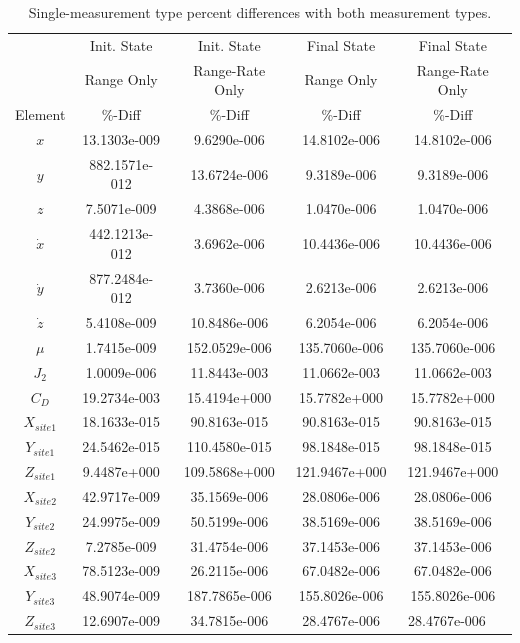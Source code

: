 \documentclass[]{aiaa-tc}%
\begin{document}
	\begin{table}[H]%
		\begin{center}
			\caption{Single-measurement type percent differences with both measurement types.}
			\label{t:SingleMeasDiff}
			\begin{tabular}{c|c|c|c|c}
\hline & Init. State & Init. State & Final State & Final State \\
 & Range Only & Range-Rate Only & Range Only & Range-Rate Only\\ 
Element & \%-Diff & \%-Diff & \%-Diff & \%-Diff\\ \hline
$x$         &     13.1303e-009  &   9.6290e-006 &   14.8102e-006 &   14.8102e-006 \\
$y$         &    882.1571e-012  &  13.6724e-006 &    9.3189e-006 &    9.3189e-006 \\
$z$         &      7.5071e-009  &   4.3868e-006 &    1.0470e-006 &    1.0470e-006 \\
$\dot{x}$   &    442.1213e-012  &   3.6962e-006 &   10.4436e-006 &   10.4436e-006 \\
$\dot{y}$   &    877.2484e-012  &   3.7360e-006 &    2.6213e-006 &    2.6213e-006 \\
$\dot{z}$   &      5.4108e-009  &  10.8486e-006 &    6.2054e-006 &    6.2054e-006 \\
$\mu$       &      1.7415e-009  & 152.0529e-006 &  135.7060e-006 &  135.7060e-006 \\
$J_2$       &      1.0009e-006  &  11.8443e-003 &   11.0662e-003 &   11.0662e-003 \\
$C_D$       &     19.2734e-003  &  15.4194e+000 &   15.7782e+000 &   15.7782e+000 \\
$X_{site1}$ &     18.1633e-015  &  90.8163e-015 &   90.8163e-015 &   90.8163e-015 \\
$Y_{site1}$ &     24.5462e-015  & 110.4580e-015 &   98.1848e-015 &   98.1848e-015 \\
$Z_{site1}$ &      9.4487e+000  & 109.5868e+000 &  121.9467e+000 &  121.9467e+000 \\
$X_{site2}$ &     42.9717e-009  &  35.1569e-006 &   28.0806e-006 &   28.0806e-006 \\
$Y_{site2}$ &     24.9975e-009  &  50.5199e-006 &   38.5169e-006 &   38.5169e-006 \\
$Z_{site2}$ &      7.2785e-009  &  31.4754e-006 &   37.1453e-006 &   37.1453e-006 \\
$X_{site3}$ &     78.5123e-009  &  26.2115e-006 &   67.0482e-006 &   67.0482e-006 \\
$Y_{site3}$ &     48.9074e-009  & 187.7865e-006 &  155.8026e-006 &  155.8026e-006 \\
$Z_{site3}$ &     12.6907e-009  &  34.7815e-006 &   28.4767e-006 &   28.4767e-006 \
			\end{tabular}
		\end{center}
	\end{table}  
\end{document}
